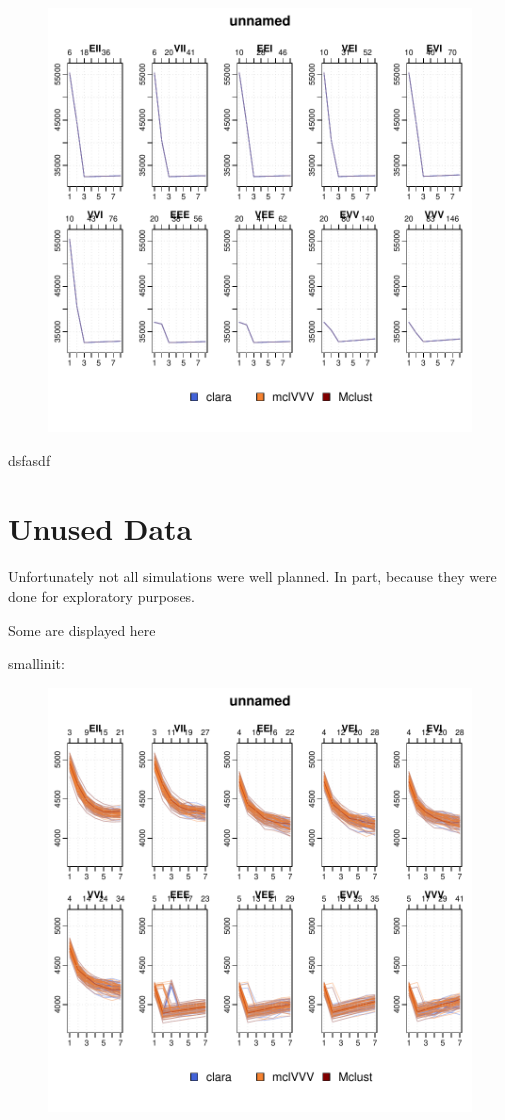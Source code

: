 \begin{figure}
    \centering
\includegraphics{App_plots-fig20fit}
\end{figure}


dsfasdf


\section{Unused Data}

Unfortunately not all simulations were well planned. In part, because they were
done for exploratory purposes.

Some are displayed here

smallinit:


\begin{figure}
    \centering
\includegraphics{App_plots-009}
\end{figure}

